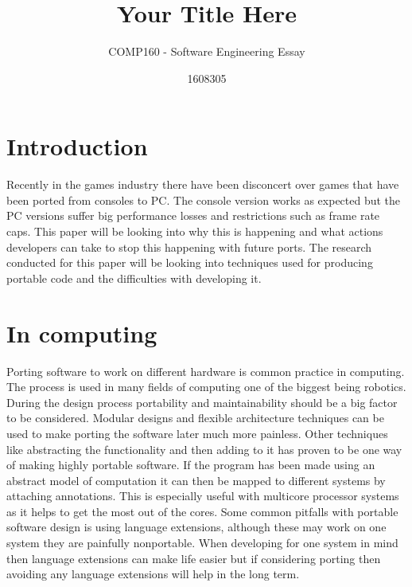\documentclass{scrartcl}
\title{Your Title Here}
\subtitle{COMP160 - Software Engineering Essay}
\author{1608305}
\begin{document}
\maketitle


\section{Introduction}

Recently in the games industry there have been disconcert over games that have been ported from consoles to PC. The console version works as expected but the PC versions suffer big performance losses and restrictions such as frame rate caps. This paper will be looking into why this is happening and what actions developers can take to stop this happening with future ports. The research conducted for this paper will be looking into techniques used for producing portable code and the difficulties with developing it.  

\section{In computing}

Porting software to work on different hardware is common practice in computing. The process is used in many fields of computing one of the biggest being robotics. \cite{6840132}\cite{1438043} During the design process portability and maintainability should be a big factor to be considered. \cite{7087005}\cite{7000937} Modular designs and flexible architecture techniques can be used to make porting the software later much more painless. \cite{885610} Other techniques like abstracting the functionality and then adding to it has proven to be one way of making highly portable software. \cite{56301} If the program has been made using an abstract model of computation it can then be mapped to different systems by attaching annotations. \cite{180499} This is especially useful with multicore processor systems as it helps to get the most out of the cores.
\newline
\newline
Some common pitfalls with portable software design is using language extensions, although these may work on one system they are painfully nonportable.\cite{1225867} When developing for one system in mind then language extensions can make life easier but if considering porting then avoiding any language extensions will help in the long term.
\end{document}
